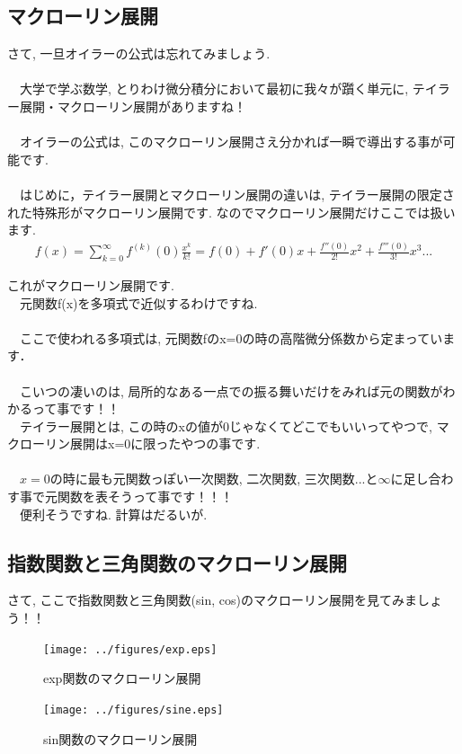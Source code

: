 \documentclass[11pt,a4paper]{ujreport} 	%
\begin{document}
\subsection{マクローリン展開}
さて, 一旦オイラーの公式は忘れてみましょう.\\
\\
　大学で学ぶ数学, とりわけ微分積分において最初に我々が躓く単元に, テイラー展開・マクローリン展開がありますね！\\
\\
　オイラーの公式は, このマクローリン展開さえ分かれば一瞬で導出する事が可能です.\\
\\
　はじめに，テイラー展開とマクローリン展開の違いは, テイラー展開の限定された特殊形がマクローリン展開です. なのでマクローリン展開だけここでは扱います.\\
\begin{eqnarray}
f(x) = \sum_{k=0}^\infty f^{(k)} (0) \frac{x^k}{k!} = f(0) + f'(0)x + \frac{f''(0)}{2!}x^2 + \frac{f'''(0)}{3!}x^3 ...
\end{eqnarray}

これがマクローリン展開です.\\
　元関数f(x)を多項式で近似するわけですね.\\
\\
　ここで使われる多項式は, 元関数fのx=0の時の高階微分係数から定まっています．\\
\\
　こいつの凄いのは, 局所的なある一点での振る舞いだけをみれば元の関数がわかるって事です！！\\
　テイラー展開とは, この時のxの値が0じゃなくてどこでもいいってやつで, マクローリン展開はx=0に限ったやつの事です.\\
\\
　$x=0$の時に最も元関数っぽい一次関数, 二次関数, 三次関数...と$\infty$に足し合わす事で元関数を表そうって事です！！！\\
　便利そうですね. 計算はだるいが.\\
\subsection{指数関数と三角関数のマクローリン展開}
さて, ここで指数関数と三角関数(sin, cos)のマクローリン展開を見てみましょう！！\\

\begin{figure}[H]
\label{im:exp}
  \centering
  \texttt{[image: ../figures/exp.eps]}
  \caption{exp関数のマクローリン展開}
\end{figure}
\begin{figure}[H]
\label{im:sine}
  \centering
  \texttt{[image: ../figures/sine.eps]}
  \caption{sin関数のマクローリン展開}
\end{figure}
\end{document}

